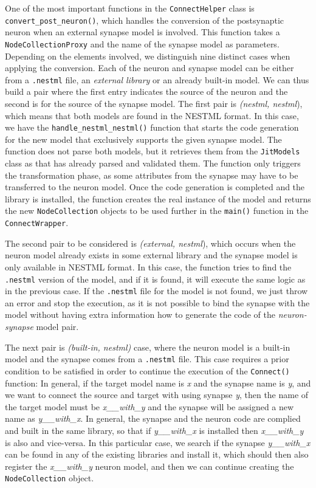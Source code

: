 One of the most important functions in the \texttt{ConnectHelper} class is \texttt{convert\_post\_neuron()}, which handles the conversion of the postsynaptic neuron when an external synapse model is involved. This function takes a \texttt{NodeCollectionProxy} and the name of the synapse model as parameters. Depending on the elements involved, we distinguish nine distinct cases when applying the conversion. Each of the neuron and synapse model can be either from a \texttt{.nestml} file, an \emph{external library} or an already built-in model. We can thus build a pair where the first entry indicates the source of the neuron and the second is for the source of the synapse model. The first pair is \emph{(nestml, nestml}), which means that both models are found in the NESTML format. In this case, we have the \texttt{handle\_nestml\_nestml()} function that starts the code generation for the new model that exclusively supports the given synapse model. The function does not parse both models, but it retrieves them from the \texttt{JitModels} class as that has already parsed and validated them. The function only triggers the transformation phase, as some attributes from the synapse may have to be transferred to the neuron model. Once the code generation is completed and the library is installed, the function creates the real instance of the model and returns the new \texttt{NodeCollection} objects to be used further in the \texttt{main()} function in the \texttt{ConnectWrapper}.

The second pair to be considered is \emph{(external, nestml}), which occurs when the neuron model already exists in some external library and the synapse model is only available in NESTML format. In this case, the function tries to find the \texttt{.nestml} version of the model, and if it is found, it will execute the same logic as in the previous case. If the \texttt{.nestml} file for the model is not found, we just throw an error and stop the execution, as it is not possible to bind the synapse with the model without having extra information how to generate the code of the \emph{neuron-synapse} model pair.

The next pair is \emph{(built-in, nestml)} case, where the neuron model is a built-in model and the synapse comes from a \texttt{.nestml} file. This case requires a prior condition to be satisfied in order to continue the execution of the \texttt{Connect()} function: In general, if the target model name is \emph{x} and the synapse name is \emph{y}, and we want to connect the source and target with using synapse \emph{y}, then the name of the target model must be \emph{x\_\_with\_y} and the synapse will be assigned a new name as \emph{y\_\_with\_x}. In general, the synapse and the neuron code are complied and built in the same library, so that if \emph{y\_\_with\_x} is installed then \emph{x\_\_with\_y} is also and vice-versa. In this particular case, we search if the synapse \emph{y\_\_with\_x} can be found in any of the existing libraries and install it, which should then also register the \emph{x\_\_with\_y} neuron model, and then we can continue creating the \texttt{NodeCollection} object.

